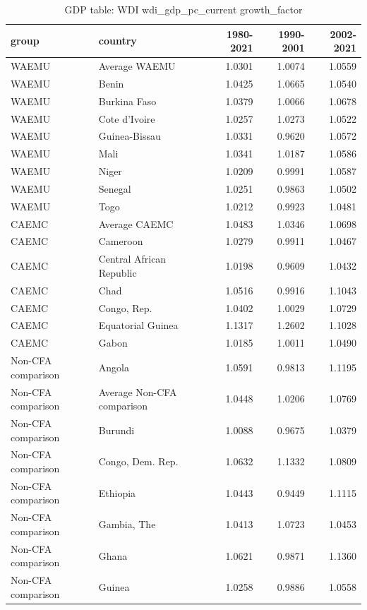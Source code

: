 \begin{table}

\caption{GDP table: WDI wdi_gdp_pc_current growth_factor}
\centering
\begin{tabular}[t]{llrrr}
\toprule
group & country & 1980-2021 & 1990-2001 & 2002-2021\\
\midrule
WAEMU & Average WAEMU & 1.0301 & 1.0074 & 1.0559\\
WAEMU & Benin & 1.0425 & 1.0665 & 1.0540\\
WAEMU & Burkina Faso & 1.0379 & 1.0066 & 1.0678\\
WAEMU & Cote d'Ivoire & 1.0257 & 1.0273 & 1.0522\\
WAEMU & Guinea-Bissau & 1.0331 & 0.9620 & 1.0572\\
\addlinespace
WAEMU & Mali & 1.0341 & 1.0187 & 1.0586\\
WAEMU & Niger & 1.0209 & 0.9991 & 1.0587\\
WAEMU & Senegal & 1.0251 & 0.9863 & 1.0502\\
WAEMU & Togo & 1.0212 & 0.9923 & 1.0481\\
CAEMC & Average CAEMC & 1.0483 & 1.0346 & 1.0698\\
\addlinespace
CAEMC & Cameroon & 1.0279 & 0.9911 & 1.0467\\
CAEMC & Central African Republic & 1.0198 & 0.9609 & 1.0432\\
CAEMC & Chad & 1.0516 & 0.9916 & 1.1043\\
CAEMC & Congo, Rep. & 1.0402 & 1.0029 & 1.0729\\
CAEMC & Equatorial Guinea & 1.1317 & 1.2602 & 1.1028\\
\addlinespace
CAEMC & Gabon & 1.0185 & 1.0011 & 1.0490\\
Non-CFA comparison & Angola & 1.0591 & 0.9813 & 1.1195\\
Non-CFA comparison & Average Non-CFA comparison & 1.0448 & 1.0206 & 1.0769\\
Non-CFA comparison & Burundi & 1.0088 & 0.9675 & 1.0379\\
Non-CFA comparison & Congo, Dem. Rep. & 1.0632 & 1.1332 & 1.0809\\
\addlinespace
Non-CFA comparison & Ethiopia & 1.0443 & 0.9449 & 1.1115\\
Non-CFA comparison & Gambia, The & 1.0413 & 1.0723 & 1.0453\\
Non-CFA comparison & Ghana & 1.0621 & 0.9871 & 1.1360\\
Non-CFA comparison & Guinea & 1.0258 & 0.9886 & 1.0558\\

\end{tabular}
\end{table}
